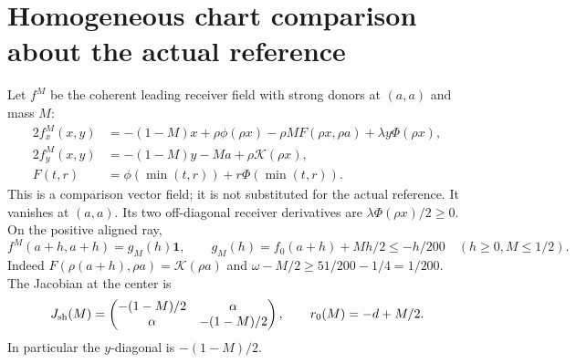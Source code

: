 \documentclass[11pt]{article}
\theoremstyle{remark}\newtheorem{remark}[theorem]{Remark}
\newcommand{\one}{\mathbf1}
\newcommand{\Kfun}{\mathcal K}
\begin{document}
\section{Homogeneous chart comparison about the actual reference}
Let $f^M$ be the coherent leading receiver field with strong
donors at $(a,a)$ and mass $M$:
\begin{align}
 2f_x^M(x,y)&=-(1-M)x+\rho\phi(\rho x)
       -\rho M F(\rho x,\rho a)+\lambda y\Phi(\rho x),\nonumber\\
 2f_y^M(x,y)&=-(1-M)y-Ma+\rho\Kfun(\rho x),\nonumber\\
 F(t,r)&=\phi(\min(t,r))+r\Phi(\min(t,r)).
 \label{an02sepv1:coherent}
\end{align}
This is a comparison vector field; it is not substituted for
the actual reference. It vanishes at $(a,a)$.
Its two off-diagonal receiver derivatives are
$\lambda\Phi(\rho x)/2\ge0$. On the positive aligned ray,
\begin{equation}
 f^M(a+h,a+h)=g_M(h)\one,\qquad
 g_M(h)=f_0(a+h)+Mh/2\le-h/200\quad(h\ge0,M\le1/2).
 \label{an02sepv1:ray}
\end{equation}
Indeed $F(\rho(a+h),\rho a)=\Kfun(\rho a)$ and
$\omega-M/2\ge51/200-1/4=1/200$.
The Jacobian at the center is
\[
 J_{\rm sh}(M)=\begin{pmatrix}-(1-M)/2&\alpha\\
                      \alpha&-(1-M)/2\end{pmatrix},\qquad
 r_0(M)=-d+M/2.
\]
In particular the $y$-diagonal is $-(1-M)/2$.
\end{document}
